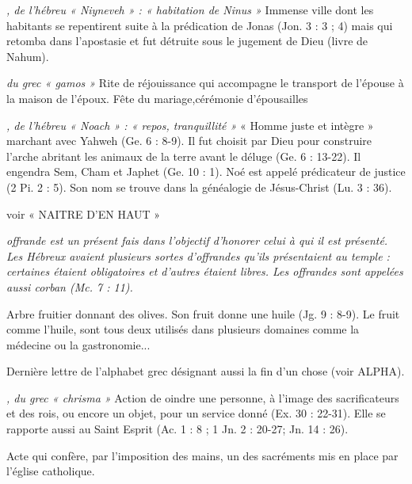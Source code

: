 \begin{multicols}{2}
\textit{, de l'hébreu « Niyneveh » : « habitation de Ninus »}\newline
Immense ville dont les habitants se repentirent suite à la prédication de Jonas (Jon. 3 : 3 ; 4) mais qui retomba dans l'apostasie et fut détruite sous le jugement de Dieu (livre de Nahum).

\textit{du grec « gamos »}\newline
Rite de réjouissance qui accompagne le transport de l'épouse à la maison de l'époux.
Fête du mariage,cérémonie d’épousailles

\textit{, de l'hébreu « Noach » : « repos, tranquillité »}\newline
« Homme juste et intègre » marchant avec Yahweh (Ge. 6 : 8-9). Il fut choisit par Dieu pour construire l'arche abritant les animaux de la terre avant le déluge (Ge. 6 : 13-22). Il engendra Sem, Cham et Japhet (Ge. 10 : 1). Noé est appelé prédicateur de justice (2 Pi. 2 : 5). Son nom se trouve dans la généalogie de Jésus-Christ (Lu. 3 : 36).

\textit{}\newline
voir « NAITRE D'EN HAUT »

\textit{}\newline
{}\textit{offrande est un présent fais dans l'objectif d'honorer celui à qui il est présenté. Les Hébreux avaient plusieurs sortes d'offrandes qu'ils présentaient au temple : certaines étaient obligatoires et d'autres étaient libres. Les offrandes sont appelées aussi corban (Mc. 7 : 11).}\newline

\textit{}\newline
Arbre fruitier donnant des olives. Son fruit donne une huile (Jg. 9 : 8-9). Le fruit comme l'huile, sont tous deux utilisés dans plusieurs domaines comme la médecine ou la gastronomie...

\textit{}\newline
Dernière lettre de l'alphabet grec désignant aussi la fin d'un chose (voir ALPHA).

\textit{, du grec « chrisma »}\newline
Action de oindre une personne, à l'image des sacrificateurs et des rois, ou encore un objet, pour un service donné (Ex. 30 : 22-31). Elle se rapporte aussi au Saint Esprit (Ac. 1 : 8 ; 1 Jn. 2 : 20-27; Jn. 14 : 26).

\textit{}\newline
Acte qui confère, par l'imposition des mains, un des sacréments mis en place par l'église catholique.


\end{multicols}
